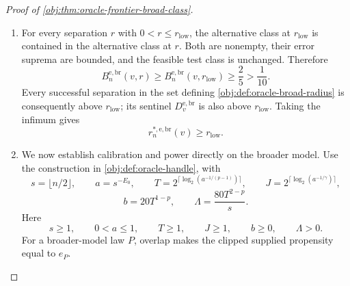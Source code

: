 \begin{proof}[Proof of \cref{obj:thm:oracle-frontier-broad-class}]
\begin{enumerate}
The feasible test class is nonempty: the jointly measurable test
\[
\phi_0^{\mathrm e}(f',\mathcal D_n,U)=0
\qquad
\bigl(f'\in C([0,1]),\ \mathcal D_n\text{ an }n\text{-record sample},\
U\in[0,1]\bigr)
\]
has rejection expectation zero under every law. For every allowed test and every law,
\[
0\le\mathsf R_n^{\mathrm e}(P,\phi^{\mathrm e})\le1.
\]
Thus the alternative errors are bounded above by one. The positive-weight atom just obtained belongs to the alternative class at \(r_{\mathrm{low}}\), so
\[
\sup_{\substack{P\in\mathcal M_v^{\mathrm{e,br}}\\
d(P)\ge r_{\mathrm{low}}}}
\left\{1-\mathsf R_n^{\mathrm e}(P,\phi^{\mathrm e})\right\}
\ge\frac25.
\]
Taking the infimum over feasible tests in
\cref{obj:def:oracle-broad-risk} proves
\[
B_n^{\mathrm{e,br}}(v,r_{\mathrm{low}})\ge\frac25.
\]
This also proves the required error witness for the particular prior constructed above.

\item For every separation \(r\) with \(0<r\le r_{\mathrm{low}}\), the alternative class at \(r_{\mathrm{low}}\) is contained in the alternative class at \(r\). Both are nonempty, their error suprema are bounded, and the feasible test class is unchanged. Therefore
\[
B_n^{\mathrm{e,br}}(v,r)
\ge B_n^{\mathrm{e,br}}(v,r_{\mathrm{low}})
\ge\frac25>\frac1{10}.
\]
Every successful separation in the set defining
\cref{obj:def:oracle-broad-radius} is consequently above \(r_{\mathrm{low}}\); its sentinel \(D_v^{\mathrm{e,br}}\) is also above \(r_{\mathrm{low}}\). Taking the infimum gives
\[
r_n^{*,\mathrm{e,br}}(v)\ge r_{\mathrm{low}}.
\]

\item We now establish calibration and power directly on the broader model. Use the construction in \cref{obj:def:oracle-handle}, with
\[
s=\lfloor n/2\rfloor,\qquad
a=s^{-E_0},\qquad
T=2^{\lceil\log_2(a^{-1/(p-1)})\rceil},\qquad
J=2^{\lceil\log_2(a^{-1/\gamma})\rceil},
\]
\[
b=20T^{1-p},
\qquad
\Lambda=\frac{80T^{2-p}}s.
\]
Here
\[
s\ge1,\qquad 0<a\le1,\qquad T\ge1,\qquad J\ge1,\qquad
b\ge0,\qquad\Lambda>0.
\]
For a broader-model law \(P\), overlap makes the clipped supplied propensity equal to \(e_P\).


\end{enumerate}
\end{proof}
